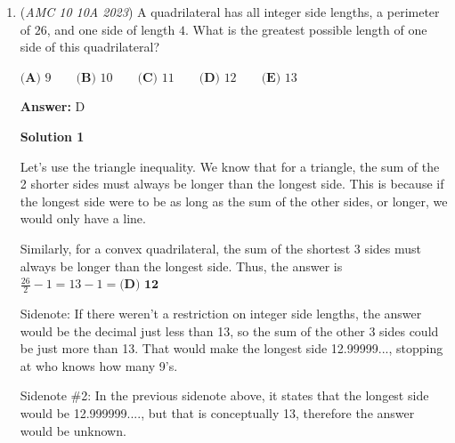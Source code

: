 \begin{enumerate}
 All it takes is to recall that $45$ squared is $2025$, and $45$ is $5 \cdot 9$. So all the squares of $5 \cdot 1, 5 \cdot 2, 5 \cdot 3$ so on are divisible by $5$. So the answer is $8$. It can be done even if one does not remember that $45$ squared is $2025$, all it takes is intuition. One can easily see mentally that $5 \cdot 8$ that is $40$ squared is $1600$, and then one has to do just one more computation and see that $5 \cdot 9$ that is $45$ squared exceeds $2023$, so the answer is $8$. 

 Note that you can find the square of any number that ends in $5$ by taking the number $5$ more than it and the number $5$ less than it, multiplying those together, and adding $25$. For example, to calculate the square of $45$, you do $40 \cdot 50 = 2000$, and $2000 + 25 = 2025$.

 And then you know that it goes up from $1$ to $44$, and the multiples of five are {$5$, $10$..., $35$, $40$}, dividing each of them by $5$, you get {$1$, $2$..., $7$, $8$}, therefore, the answer is $\boxed{\textbf{(A) 8}}$



	\item (\textit{AMC 10 10A 2023}) A quadrilateral has all integer side lengths, a perimeter of $26$, and one side of length $4$. What is the greatest possible length of one side of this quadrilateral?


 $\textbf{(A) }9\qquad\textbf{(B) }10\qquad\textbf{(C) }11\qquad\textbf{(D) }12\qquad\textbf{(E) }13$

 \textbf{Answer: }D



\textbf{Solution 1}

Let's use the triangle inequality. We know that for a triangle, the sum of the 2 shorter sides must always be longer than the longest side. This is because if the longest side were to be as long as the sum of the other sides, or longer, we would only have a line.

 Similarly, for a convex quadrilateral, the sum of the shortest 3 sides must always be longer than the longest side. Thus, the answer is $\frac{26}{2}-1=13-1=\boxed {\textbf{(D) 12}}$

 Sidenote: If there weren't a restriction on integer side lengths, the answer would be the decimal just less than 13, so the sum of the other 3 sides could be just more than 13. That would make the longest side 12.99999..., stopping at who knows how many 9's.

 Sidenote \#2: In the previous sidenote above, it states that the longest side would be 12.999999...., but that is conceptually 13, therefore the answer would be unknown.


\end{enumerate}
